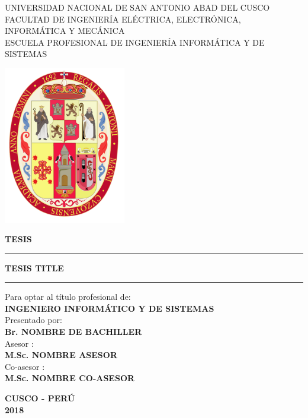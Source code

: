 \begin{center} 
{ UNIVERSIDAD NACIONAL DE SAN ANTONIO ABAD DEL CUSCO} \\
{ FACULTAD DE INGENIERÍA ELÉCTRICA, ELECTRÓNICA, INFORMÁTICA Y MECÁNICA} \\
{ ESCUELA PROFESIONAL DE INGENIERÍA INFORMÁTICA Y DE SISTEMAS} \\
\end{center}



\begin{center}
\includegraphics[width=0.4\textwidth]{figs/cover/logo-unsaac.png}
\end{center}


\begin{center} 
\textbf{TESIS\\} 

\noindent\rule{15cm}{3pt}
{\normalsize \bf {\textsc{{TESIS TITLE}}}} \\
\noindent\rule{15cm}{3pt}

\end{center}


\begin{flushright}
{
\vspace{0.5 cm}
Para optar al título profesional de:\\ \textbf{INGENIERO INFORMÁTICO Y DE SISTEMAS} \\
 Presentado por:\\ \textbf{Br. NOMBRE DE BACHILLER} \\
 Asesor :\\ \textbf{M.Sc. NOMBRE ASESOR} \\
 Co-asesor :\\ \textbf{M.Sc. NOMBRE CO-ASESOR} \\
}
\end{flushright}

\vspace{1.0 cm}
\begin{center} 
\textbf{CUSCO - PERÚ} \\
\textbf{2018}
\end{center}
\vspace{1.0 cm}

\clearpage



